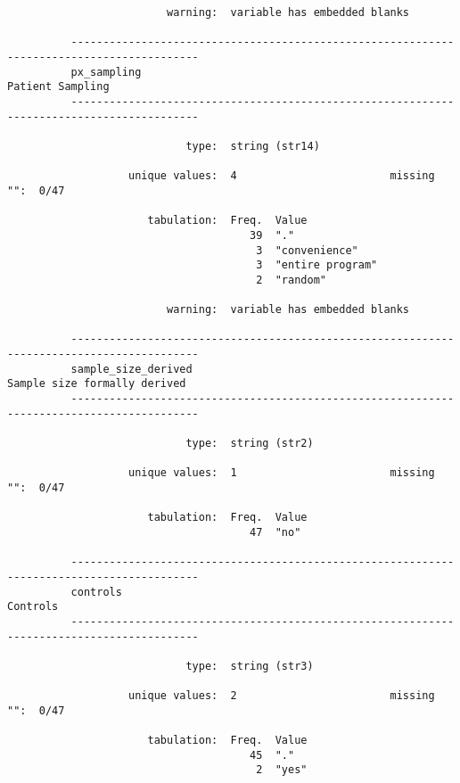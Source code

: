 \documentclass{article}
\begin{document}
\begin{verbatim}
                         warning:  variable has embedded blanks
          
          ------------------------------------------------------------------------------------------
          px_sampling                                                               Patient Sampling
          ------------------------------------------------------------------------------------------
          
                            type:  string (str14)
          
                   unique values:  4                        missing "":  0/47
          
                      tabulation:  Freq.  Value
                                      39  "."
                                       3  "convenience"
                                       3  "entire program"
                                       2  "random"
          
                         warning:  variable has embedded blanks
          
          ------------------------------------------------------------------------------------------
          sample_size_derived                                           Sample size formally derived
          ------------------------------------------------------------------------------------------
          
                            type:  string (str2)
          
                   unique values:  1                        missing "":  0/47
          
                      tabulation:  Freq.  Value
                                      47  "no"
          
          ------------------------------------------------------------------------------------------
          controls                                                                          Controls
          ------------------------------------------------------------------------------------------
          
                            type:  string (str3)
          
                   unique values:  2                        missing "":  0/47
          
                      tabulation:  Freq.  Value
                                      45  "."
                                       2  "yes"
          

\end{verbatim}
\end{document}
